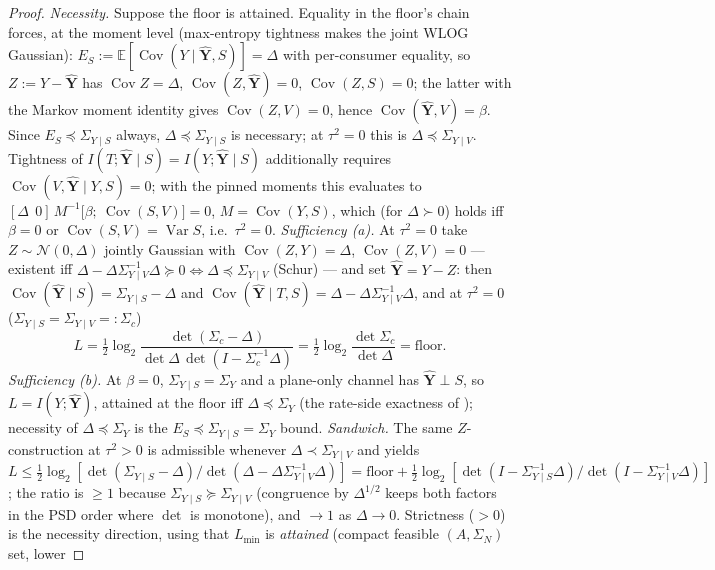 \documentclass[11pt]{article}
\newcommand{\E}{\mathbb{E}}\newcommand{\tr}{\operatorname{tr}}
\newcommand{\Cov}{\operatorname{Cov}}\newcommand{\hX}{\widehat X}
\begin{document}
\begin{proof}
\emph{Necessity.} Suppose the floor is attained. Equality in the floor's
chain forces, at the moment level (max-entropy tightness makes the joint
WLOG Gaussian): $E_S:=\E[\Cov(Y\mid\hat{\mathbf Y},S)]=\Delta$ with
per-consumer equality, so $Z:=Y-\hat{\mathbf Y}$ has $\Cov Z=\Delta$,
$\Cov(Z,\hat{\mathbf Y})=0$, $\Cov(Z,S)=0$; the latter with the Markov
moment identity gives $\Cov(Z,V)=0$, hence
$\Cov(\hat{\mathbf Y},V)=\beta$. Since $E_S\preceq\Sigma_{Y\mid S}$ always,
$\Delta\preceq\Sigma_{Y\mid S}$ is necessary; at $\tau^2=0$ this is
$\Delta\preceq\Sigma_{Y\mid V}$. Tightness of
$I(T;\hat{\mathbf Y}\mid S)=I(Y;\hat{\mathbf Y}\mid S)$ additionally
requires $\Cov(V,\hat{\mathbf Y}\mid Y,S)=0$; with the pinned moments this
evaluates to
$[\Delta\ \ 0]\,M^{-1}\bigl[\beta;\ \Cov(S,V)\bigr]=0$, $M=\Cov(Y,S)$,
which (for $\Delta\succ0$) holds iff $\beta=0$ or
$\Cov(S,V)=\operatorname{Var}S$, i.e.\ $\tau^2=0$. \emph{Sufficiency (a).}
At $\tau^2=0$ take $Z\sim\mathcal N(0,\Delta)$ jointly Gaussian with
$\Cov(Z,Y)=\Delta$, $\Cov(Z,V)=0$ --- existent iff
$\Delta-\Delta\Sigma_{Y\mid V}^{-1}\Delta\succeq0
\Leftrightarrow\Delta\preceq\Sigma_{Y\mid V}$ (Schur) --- and set
$\hat{\mathbf Y}=Y-Z$: then $\Cov(\hat{\mathbf Y}\mid S)
=\Sigma_{Y\mid S}-\Delta$ and
$\Cov(\hat{\mathbf Y}\mid T,S)=\Delta-\Delta\Sigma_{Y\mid V}^{-1}\Delta$,
and at $\tau^2=0$ ($\Sigma_{Y\mid S}=\Sigma_{Y\mid V}=:\Sigma_c$)
\[
L=\tfrac12\log_2\frac{\det(\Sigma_c-\Delta)}
{\det\Delta\,\det(I-\Sigma_c^{-1}\Delta)}
=\tfrac12\log_2\frac{\det\Sigma_c}{\det\Delta}=\mathrm{floor}.
\]
\emph{Sufficiency (b).} At $\beta=0$, $\Sigma_{Y\mid S}=\Sigma_Y$ and a
plane-only channel has $\hat{\mathbf Y}\perp S$, so $L=I(Y;\hat{\mathbf
Y})$, attained at the floor iff $\Delta\preceq\Sigma_Y$ (the rate-side
exactness of \cite{bondtaxnote}); necessity of $\Delta\preceq\Sigma_Y$ is
the $E_S\preceq\Sigma_{Y\mid S}=\Sigma_Y$ bound. \emph{Sandwich.} The same
$Z$-construction at $\tau^2>0$ is admissible whenever
$\Delta\prec\Sigma_{Y\mid V}$ and yields
$L\le\tfrac12\log_2[\det(\Sigma_{Y\mid S}-\Delta)/\det(\Delta-
\Delta\Sigma_{Y\mid V}^{-1}\Delta)]=\mathrm{floor}
+\tfrac12\log_2[\det(I-\Sigma_{Y\mid S}^{-1}\Delta)/\det(I-
\Sigma_{Y\mid V}^{-1}\Delta)]$; the ratio is $\ge1$ because
$\Sigma_{Y\mid S}\succeq\Sigma_{Y\mid V}$ (congruence by $\Delta^{1/2}$
keeps both factors in the PSD order where $\det$ is monotone), and $\to1$
as $\Delta\to0$. Strictness ($>0$) is the necessity direction, using that
$L_{\min}$ is \emph{attained} (compact feasible $(A,\Sigma_N)$ set, lower

\end{proof}
\end{document}
